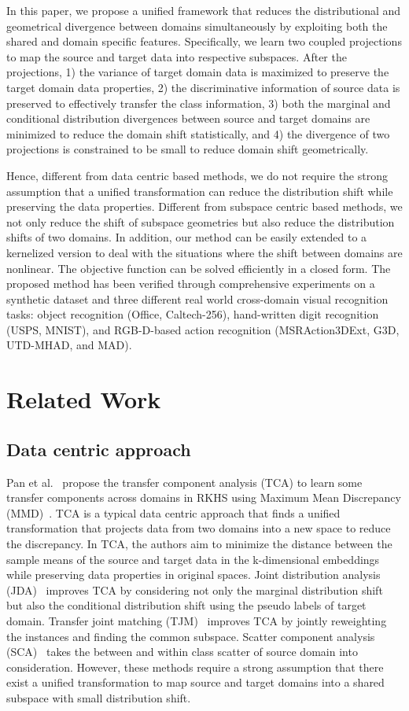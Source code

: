 \documentclass[10pt,twocolumn,letterpaper]{article}
\begin{document}
In this paper, we propose a unified framework that reduces the distributional and geometrical divergence between domains simultaneously by exploiting both the shared and domain specific features. Specifically, we learn two coupled projections to map the source and target data into respective subspaces.
After the projections, 1) the variance of target domain data is maximized to preserve the target domain data properties, 2) the discriminative information of source data is preserved to effectively transfer the class information, 3) both the marginal and conditional distribution divergences between source and target domains are minimized to reduce the domain shift statistically, and 4) the divergence of two projections is constrained to be small to reduce domain shift geometrically. 


Hence, different from data centric based methods, we do not require the strong assumption that a unified transformation can reduce the distribution shift while preserving
the data properties. Different from subspace centric based methods, we not only reduce the shift of subspace geometries but also reduce the distribution shifts of two domains.
In addition, our method can be easily extended to a kernelized version to deal with the situations where the shift between domains are nonlinear. The objective function can be solved efficiently in a closed form. The proposed method has been verified through comprehensive experiments on a synthetic dataset and three different real world cross-domain visual recognition tasks: object recognition (Office, Caltech-256), hand-written digit recognition (USPS, MNIST), and RGB-D-based action recognition (MSRAction3DExt, G3D, UTD-MHAD, and MAD).


\section{Related Work}
\subsection{Data centric approach}
Pan et al.~\cite{Pan2011} propose the transfer component analysis (TCA) to learn some transfer components across domains in RKHS using Maximum Mean Discrepancy (MMD)~\cite{Gretton2012}. TCA is a typical data centric approach that finds a unified transformation  that projects data from two domains into a new space to reduce the discrepancy. In TCA, the authors aim to minimize the distance between the sample means of the source and target data in the k-dimensional embeddings while preserving data properties in original spaces. Joint distribution analysis (JDA)~\cite{Long2013} improves TCA by considering not only the marginal distribution shift but also the conditional distribution shift using the pseudo labels of target domain. Transfer joint matching (TJM)~\cite{Long2014} improves TCA by jointly reweighting the instances and finding the common subspace. Scatter component analysis (SCA)~\cite{Ghifary2016} takes the between and within class scatter of source domain into consideration. However, these methods require a strong assumption that there exist a unified transformation to map source and target domains into a shared subspace with small distribution shift. 
\end{document}
